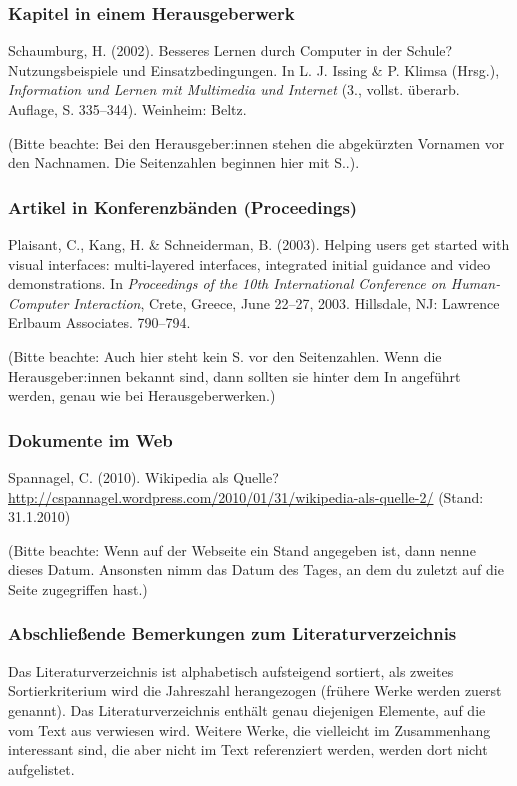 \documentclass{../cssheet}
\begin{document}
\subsubsection*{Kapitel in einem Herausgeberwerk}

Schaumburg, H. (2002). Besseres Lernen durch Computer in der Schule?
Nutzungsbeispiele und Einsatzbedingungen. In L. J. Issing \& P. Klimsa
(Hrsg.), \emph{Information und Lernen mit Multimedia und Internet} (3.,
vollst. überarb. Auflage, S. 335--344). Weinheim: Beltz.

(Bitte beachte: Bei den Herausgeber:innen stehen die abgekürzten Vornamen vor
den Nachnamen. Die Seitenzahlen beginnen hier mit \glqq{}S.\grqq{}.).

\subsubsection*{Artikel in Konferenzbänden (Proceedings)}

Plaisant, C., Kang, H. \& Schneiderman, B. (2003). Helping users get
started with visual interfaces: multi-layered interfaces, integrated
initial guidance and video demonstrations. In \emph{Proceedings of the
10th International Conference on Human-Computer Interaction}, Crete,
Greece, June 22--27, 2003. Hillsdale, NJ: Lawrence Erlbaum Associates.
790--794.

(Bitte beachte: Auch hier steht kein \glqq{}S.\grqq{} vor den Seitenzahlen. Wenn die
Herausgeber:innen bekannt sind, dann sollten sie hinter dem \glqq{}In\grqq{} angeführt
werden, genau wie bei Herausgeberwerken.)

\subsubsection*{Dokumente im Web}

Spannagel, C. (2010). Wikipedia als Quelle?
\url{http://cspannagel.wordpress.com/2010/01/31/wikipedia-als-quelle-2/}
(Stand: 31.1.2010)

(Bitte beachte: Wenn auf der Webseite ein Stand angegeben ist, dann
nenne dieses Datum. Ansonsten nimm das Datum des Tages, an dem du
zuletzt auf die Seite zugegriffen hast.)

\subsubsection*{Abschließende Bemerkungen zum Literaturverzeichnis}

Das Literaturverzeichnis ist alphabetisch aufsteigend sortiert, als
zweites Sortierkriterium wird die Jahreszahl herangezogen (frühere Werke
werden zuerst genannt). Das Literaturverzeichnis enthält genau
diejenigen Elemente, auf die vom Text aus verwiesen wird. Weitere Werke,
die vielleicht im Zusammenhang interessant sind, die aber nicht im Text
referenziert werden, werden dort nicht aufgelistet.
\end{document}
